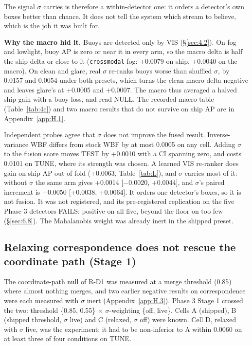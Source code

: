 \documentclass[10pt]{article}
\begin{document}
The signal $\sigma$ carries is therefore a within-detector one: it orders a detector's own boxes better than chance. It does not tell the system which stream to believe, which is the job it was built for.

\textbf{Why the macro hid it.} Buoys are detected only by VIS (\S\ref{sec:4.2}). On fog and lowlight, buoy AP is zero or near it in every arm, so the macro delta is half the ship delta or close to it (\texttt{crossmodal} fog: +0.0079 on ship, +0.0040 on the macro). On clean and glare, real $\sigma$ re-ranks buoys worse than shuffled $\sigma$, by 0.0157 and 0.0054 under both presets, which turns the clean macro delta negative and leaves glare's at +0.0005 and +0.0007. The macro thus averaged a halved ship gain with a buoy loss, and read NULL. The recorded macro table (Table~\ref{tab:4c}) and two macro results that do not survive on ship AP are in Appendix~\ref{app:H.1}.

Independent probes agree that $\sigma$ does not improve the fused result. Inverse-variance WBF differs from stock WBF by at most 0.0005 on any cell. Adding $\sigma$ to the fusion score moves TEST by +0.0010 with a CI spanning zero, and costs 0.0101 on TUNE, where its strength was chosen. A learned VIS re-ranker does gain on ship AP out of fold (+0.0063, Table~\ref{tab:L}), and $\sigma$ carries most of it: without $\sigma$ the same arm gives +0.0014 [$-$0.0020, +0.0044], and $\sigma$'s paired increment is +0.0050 [+0.0038, +0.0064]. It orders one detector's boxes, so it is not fusion. It was not registered, and its pre-registered replication on the five Phase 3 detectors FAILS: positive on all five, beyond the floor on too few (\S\ref{sec:6.8}). The Mahalanobis weight was already inert in the shipped preset.

\subsection{Relaxing correspondence does not rescue the coordinate path (Stage 1)}\label{sec:6.5}
The coordinate-path null of R-D1 was measured at a merge threshold (0.85) where almost nothing merges, and two earlier negative results on correspondence were each measured with $\sigma$ inert (Appendix~\ref{app:H.3}). Phase 3 Stage 1 crossed the two: threshold \{0.85, 0.55\} $\times$ $\sigma$-weighting \{off, live\}. Cells A (shipped), B (shipped threshold, $\sigma$ live) and C (relaxed, $\sigma$ off) were known. Cell D, relaxed with $\sigma$ live, was the experiment: it had to be non-inferior to A within 0.0060 on at least three of four conditions on TUNE.
\end{document}
